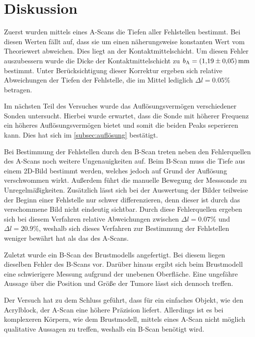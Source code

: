 \section{Diskussion}
\label{sec:Diskussion} 
Zuerst wurden mittels eines A-Scans die Tiefen aller Fehlstellen bestimmt. Bei diesen Werten fällt auf, dass sie um einen näherungsweise konstanten Wert vom Theoriewert abweichen.
Dies liegt an der Kontaktmittelschicht. Um diesen Fehler auszubessern wurde die Dicke der Kontaktmittelschicht zu $b_\text{A} = \qty{1.19 +- 0.05}{\milli\metre}$ bestimmt. 
Unter Berücksichtigung dieser Korrektur ergeben sich relative Abweichungen der Tiefen der Fehlstelle, die im Mittel lediglich $\Delta l = 0.05\%$ betragen. 

Im nächsten Teil des Versuches wurde das Auflösungsvermögen verschiedener Sonden untersucht. Hierbei wurde erwartet, dass die Sonde mit höherer Frequenz
ein höheres Auflösungsvermögen bietet und somit die beiden Peaks 
seperieren kann. Dies hat sich im \autoref{subsec:auflösung} bestätigt. 

Bei Bestimmung der Fehlstellen durch den B-Scan treten neben den Fehlerquellen des A-Scans noch weitere Ungenauigkeiten auf.
Beim B-Scan muss die Tiefe aus einem 2D-Bild bestimmt werden, welches jedoch auf Grund der Auflösung verschwommen wirkt. Außerdem führt die manuelle Bewegung der Messsonde
zu Unregelmäßigkeiten. Zusätzlich lässt sich bei der Auswertung der Bilder teilweise der Beginn einer Fehlstelle nur schwer differenzieren, denn dieser ist durch das 
verschommene Bild nicht eindeutig sichtbar. Durch diese Fehlerquellen ergeben sich bei diesem Verfahren relative 
Abweichungen zwischen $\Delta l = 0.07\%$ und $\Delta l = 20.9\%$, weshalb 
sich dieses Verfahren zur Bestimmung der Fehlstellen weniger bewährt hat als das des A-Scans. 

Zuletzt wurde ein B-Scan des Brustmodells angefertigt. Bei diesem liegen dieselben Fehler des B-Scans
vor. Darüber hinaus ergibt sich beim Brustmodell eine schwierigere Messung aufgrund der unebenen Oberfläche.
Eine ungefähre Aussage über die Position und Größe der Tumore lässt sich dennoch treffen. 

Der Versuch hat zu dem Schluss geführt, dass für ein einfaches Objekt, wie den Acrylblock, 
der A-Scan eine höhere Präzision liefert. Allerdings ist es bei komplexeren Körpern, wie dem Brustmodell, mittels eines A-Scan nicht möglich qualitative Aussagen zu treffen,
weshalb ein B-Scan benötigt wird.
